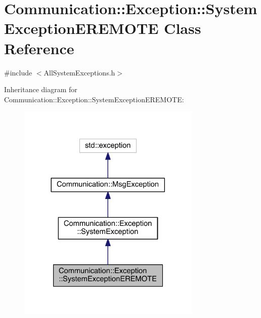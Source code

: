 \hypertarget{class_communication_1_1_exception_1_1_system_exception_e_r_e_m_o_t_e}{}\section{Communication\+:\+:Exception\+:\+:System\+Exception\+E\+R\+E\+M\+O\+T\+E Class Reference}
\label{class_communication_1_1_exception_1_1_system_exception_e_r_e_m_o_t_e}


{\ttfamily \#include $<$All\+System\+Exceptions.\+h$>$}



Inheritance diagram for Communication\+:\+:Exception\+:\+:System\+Exception\+E\+R\+E\+M\+O\+T\+E\+:\nopagebreak
\begin{figure}[H]
\begin{center}
\leavevmode
\includegraphics[width=248pt]{class_communication_1_1_exception_1_1_system_exception_e_r_e_m_o_t_e__inherit__graph}
\end{center}
\end{figure}


